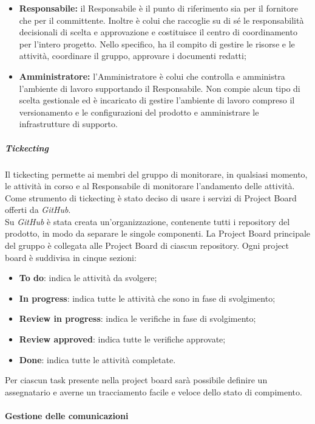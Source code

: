 \begin{itemize}
   				\item \textbf{Responsabile:} il Responsabile è il punto di riferimento sia per il fornitore che per il committente. Inoltre è colui che raccoglie su di sé le responsabilità decisionali di scelta e approvazione e costituisce il centro di coordinamento per l'intero progetto. Nello specifico, ha il compito di gestire le risorse e le attività, coordinare il gruppo, approvare i documenti redatti;
   				\item \textbf{Amministratore:} l'Amministratore è colui che controlla e amministra l'ambiente di lavoro supportando il Responsabile. Non compie alcun tipo di scelta gestionale ed è incaricato di gestire  l'ambiente di lavoro compreso il versionamento e le configurazioni del prodotto e amministrare le infrastrutture di supporto.
   			\end{itemize}
   		
   		\subparagraph*{Tickecting}
   		Il tickecting permette ai membri del gruppo di monitorare, in qualsiasi momento, le attività in corso e al Responsabile di monitorare l'andamento delle attività.\\   		
   		\noindent Come strumento di tickecting è stato deciso di usare i servizi di Project Board offerti da \textit{GitHub\glos}.\\   		
   		Su \textit{GitHub\glo} è stata creata un'organizzazione, contenente tutti i repository del prodotto, in modo da separare le singole componenti.
   		La Project Board principale del gruppo è collegata alle Project Board di ciascun repository.
   		Ogni project board è suddivisa in cinque sezioni:
   		\begin{itemize}
   			\item \textbf{To do}: indica le attività da svolgere;
   			\item \textbf{In progress}: indica tutte le attività che sono in fase di svolgimento;
   			\item \textbf{Review in progress}: indica le verifiche in fase di svolgimento;
   			\item \textbf{Review approved}: indica tutte le verifiche approvate;
   			\item \textbf{Done}: indica tutte le attività completate.
   		\end{itemize}
   		Per ciascun task presente nella project board sarà possibile definire un assegnatario e averne un tracciamento facile e veloce dello stato di compimento.

	
   	\paragraph{Gestione delle comunicazioni}
   
